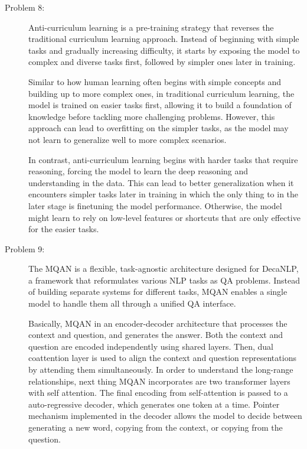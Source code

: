 \documentclass[10pt]{article}
\begin{document}
\begin{description}
\item[Problem 8:] \hfill %

Anti-curriculum learning is a pre-training strategy that reverses the traditional curriculum learning approach. 
Instead of beginning with simple tasks and gradually increasing difficulty, it starts by exposing the model to 
complex and diverse tasks first, followed by simpler ones later in training.

Similar to how human learning often begins with simple concepts and building up to more complex ones, in traditional curriculum learning,
the model is trained on easier tasks first, allowing it to build a foundation of knowledge before tackling more challenging problems.
However, this approach can lead to overfitting on the simpler tasks, as the model may not learn to generalize well to more complex scenarios.

In contrast, anti-curriculum learning begins with harder tasks that require reasoning, forcing the model to learn the deep reasoning and understanding in the data.
This can lead to better generalization when it encounters simpler tasks later in training in which the only thing to in the later stage is finetuning the model performance.
Otherwise, the model might learn to rely on low-level features or shortcuts that are only effective for the easier tasks.

\item[Problem 9:] \hfill %

The MQAN is a flexible, task-agnostic architecture designed for DecaNLP, a framework that reformulates various NLP tasks as QA problems. 
Instead of building separate systems for different tasks, MQAN enables a single model to handle them all through a unified QA interface.

Basically, MQAN in an encoder-decoder architecture that processes the context and question, and generates the answer.
Both the context and question are encoded independently using shared layers. Then, dual coattention layer is used to align the context and question representations
by attending them simultaneously. In order to understand the long-range relationships, next thing MQAN incorporates are two transformer layers with self attention.
The final encoding from self-attention is passed to a auto-regressive decoder, which generates one token at a time.
Pointer mechanism implemented in the decoder allows the model to decide between generating a new word, copying from the context, or copying from the question.


\end{description}
\end{document}
